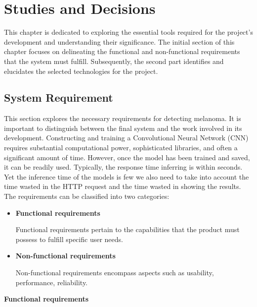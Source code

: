 \chapter{Studies and Decisions}
\label{cap:studies_and_decisions}

This chapter is dedicated to exploring the essential tools required for the project's development and understanding their significance. The initial section of this chapter focuses on delineating the functional and non-functional requirements that the system must fulfill. Subsequently, the second part identifies and elucidates the selected technologies for the project.

\section{System Requirement}

This section explores the necessary requirements for detecting melanoma. It is important to distinguish between the final system and the work involved in its development. Constructing and training a Convolutional Neural Network (CNN) requires substantial computational power, sophisticated libraries, and often a significant amount of time. However, once the model has been trained and saved, it can be readily used. Typically, the response time inferring is within seconds. Yet the inference time of the models is few we also need to take into account the time wasted in the HTTP request and the time wasted in showing the results. \\

The requirements can be classified into two categories:

\begin{itemize}
    \item \textbf{Functional requirements}

    Functional requirements pertain to the capabilities that the product must possess to fulfill specific user needs.

    \item \textbf{Non-functional requirements}

    Non-functional requirements encompass aspects such as usability, performance, reliability.
\end{itemize}

\newpage

\vspace{0.5cm}
\textbf{Functional requirements} \\

